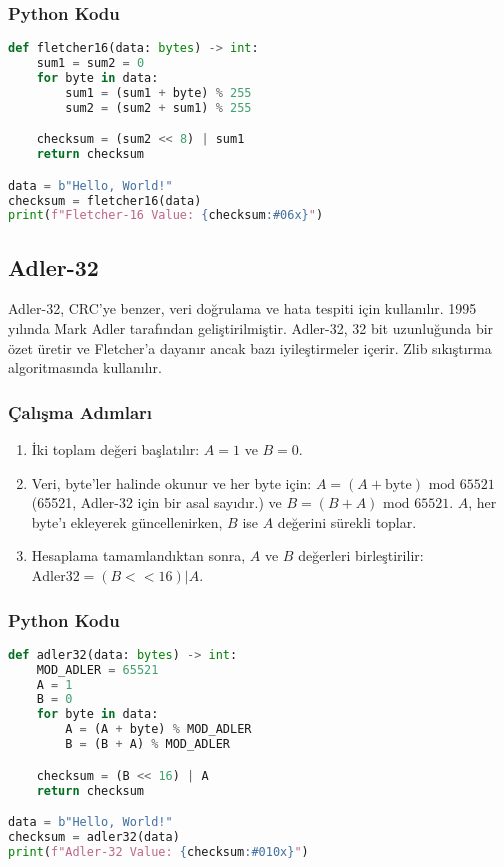 \subsubsection{Python Kodu}

\begin{lstlisting}[language=Python]
def fletcher16(data: bytes) -> int:
    sum1 = sum2 = 0
    for byte in data:
        sum1 = (sum1 + byte) % 255
        sum2 = (sum2 + sum1) % 255

    checksum = (sum2 << 8) | sum1
    return checksum

data = b"Hello, World!"
checksum = fletcher16(data)
print(f"Fletcher-16 Value: {checksum:#06x}")
\end{lstlisting}

\newpage

\subsection{Adler-32}

Adler-32, CRC'ye benzer, veri doğrulama ve hata tespiti için kullanılır. 1995 yılında Mark Adler tarafından geliştirilmiştir. Adler-32, 32 bit uzunluğunda bir özet üretir ve Fletcher'a dayanır ancak bazı iyileştirmeler içerir. Zlib sıkıştırma algoritmasında kullanılır. 

\subsubsection{Çalışma Adımları}

\begin{enumerate}
    \item İki toplam değeri başlatılır: $A = 1$ ve $B = 0$.
    \item Veri, byte'ler halinde okunur ve her byte için: $A = (A + \text{byte}) \text{ mod } 65521$ (65521, Adler-32 için bir asal sayıdır.) ve $B = (B + A) \text{ mod } 65521$. $A$, her byte'ı ekleyerek güncellenirken, $B$ ise $A$ değerini sürekli toplar.
    \item Hesaplama tamamlandıktan sonra, $A$ ve $B$ değerleri birleştirilir: $\text{Adler32} = (B << 16) | A$.
\end{enumerate}

\subsubsection{Python Kodu}

\begin{lstlisting}[language=Python]
def adler32(data: bytes) -> int:
    MOD_ADLER = 65521
    A = 1
    B = 0
    for byte in data:
        A = (A + byte) % MOD_ADLER
        B = (B + A) % MOD_ADLER

    checksum = (B << 16) | A
    return checksum

data = b"Hello, World!"
checksum = adler32(data)
print(f"Adler-32 Value: {checksum:#010x}")
\end{lstlisting}

